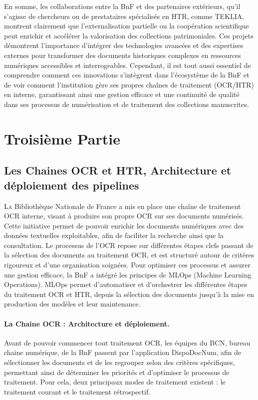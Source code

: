 \documentclass[a4paper,12pt,twoside]{book}
\begin{document}
	En somme, les collaborations entre la BnF et des partenaires extérieurs, qu’il s’agisse de chercheurs ou de prestataires spécialisés en HTR, comme TEKLIA, montrent clairement que l’externalisation partielle ou la coopération scientifique peut enrichir et accélérer la valorisation des collections patrimoniales. Ces projets démontrent l’importance d’intégrer des technologies avancées et des expertises externes pour transformer des documents historiques complexes en ressources numériques accessibles et interrogeables. Cependant, il est tout aussi essentiel de comprendre comment ces innovations s’intègrent dans l’écosystème de la BnF et de voir comment l’institution gère ses propres chaînes de traitement (OCR/HTR) en interne, garantissant ainsi une gestion efficace et une continuité de qualité dans ses processus de numérisation et de traitement des collections manuscrites.
	
	\part{Troisième Partie}
	\chapter{Les Chaines OCR et HTR,
		Architecture et déploiement des pipelines}
	
	\lettrine{L}a Bibliothèque Nationale de France  a mis en place une chaîne de traitement OCR interne, visant à produire son propre OCR sur ses documents numérisés. Cette initiative permet de pouvoir enrichir les documents numériques avec des données textuelles exploitables, afin de faciliter la recherche ainsi que la consultation. Le processus de l’OCR repose sur différentes étapes clefs passant de la sélection des documents au traitement OCR, et est structuré autour de critères rigoureux et d’une organisation soignées. Pour optimiser ces processus et assurer une gestion efficace, la BnF a intégré les principes de MLOps (Machine Learning Operations). MLOps permet d’automatiser et d’orchestrer les différentes étapes du traitement OCR et HTR, depuis la sélection des documents jusqu’à la mise en production des modèles et leur maintenance.
	
	\subsection{La Chaine OCR : Architecture et déploiement.}
	
	Avant de pouvoir commencer tout traitement OCR, les équipes du BCN, bureau chaine numérique, de la BnF passent par l’application DispoDocNum, afin de sélectionner les documents et de les regrouper selon des critères spécifiques, permettant ainsi de déterminer les priorités et d’optimiser le processus de traitement. 
	Pour cela, deux principaux modes de traitement existent : le traitement courant et le traitement rétrospectif.
	
\end{document}
